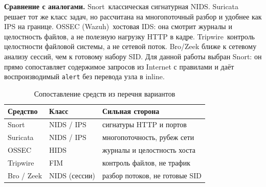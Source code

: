\pagebreak
\textbf{Сравнение с аналогами.}
Snort~\mdash  классическая сигнатурная NIDS. Suricata решает тот же класс задач, но рассчитана на многопоточный разбор и удобнее как IPS на границе. OSSEC (Wazuh)~\mdash  хостовая IDS: она смотрит журналы и целостность файлов, а не полезную нагрузку HTTP в кадре. Tripwire~\mdash  контроль целостности файловой системы, а не сетевой поток. Bro/Zeek ближе к сетевому анализу сессий, чем к готовому набору SID. Для данной работы выбран Snort: он прямо сопоставляет содержимое запросов из Internet с правилами и даёт воспроизводимый \texttt{alert} без перевода узла в inline.

\begin{table}[H]
	\begin{tabularx}{\textwidth}{|l|l|X|}
		\hline
		\textbf{Средство} & \textbf{Класс} & \textbf{Сильная сторона} \\
		\hline
		Snort & NIDS / IPS & сигнатуры HTTP и портов \\
		\hline
		Suricata & NIDS / IPS & многопоточность, рубеж сети \\
		\hline
		OSSEC & HIDS & журналы и целостность хоста \\
		\hline
		Tripwire & FIM & контроль файлов, не трафик \\
		\hline
		Bro / Zeek & NIDS (сессии) & разбор потоков, не готовые SID \\
		\hline
	\end{tabularx}
	\caption{Сопоставление средств из перечня вариантов}
	\label{tab:cmp}
\end{table}
